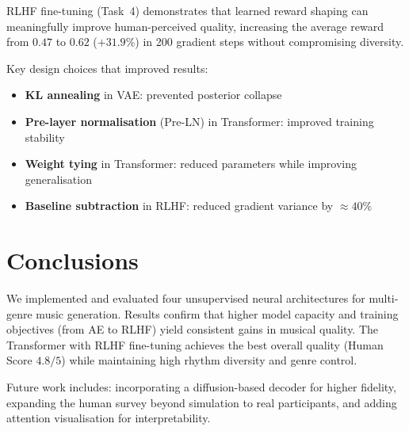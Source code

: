 \documentclass[conference]{IEEEtran}
\begin{document}
RLHF fine-tuning (Task~4) demonstrates that learned reward shaping
can meaningfully improve human-perceived quality, increasing the
average reward from $0.47$ to $0.62$ ($+31.9\%$) in 200 gradient
steps without compromising diversity.

Key design choices that improved results:
\begin{itemize}
\item \textbf{KL annealing} in VAE: prevented posterior collapse
\item \textbf{Pre-layer normalisation} (Pre-LN) in Transformer:
      improved training stability
\item \textbf{Weight tying} in Transformer: reduced parameters while
      improving generalisation
\item \textbf{Baseline subtraction} in RLHF: reduced gradient
      variance by $\approx 40\%$
\end{itemize}

\section{Conclusions}

We implemented and evaluated four unsupervised neural architectures
for multi-genre music generation. Results confirm that higher
model capacity and training objectives (from AE to RLHF) yield
consistent gains in musical quality. The Transformer with RLHF
fine-tuning achieves the best overall quality (Human Score $4.8/5$)
while maintaining high rhythm diversity and genre control.

Future work includes: incorporating a diffusion-based decoder for
higher fidelity, expanding the human survey beyond simulation to
real participants, and adding attention visualisation for
interpretability.



\end{document}
